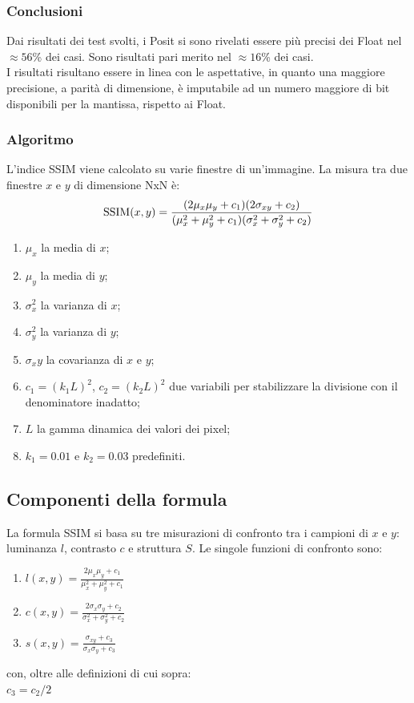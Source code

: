 \documentclass[a4paper,11pt]{article}
\begin{document}
    \subsubsection{Conclusioni}
    Dai risultati dei test svolti, i Posit si sono rivelati essere più precisi dei Float nel $\approx56$\% dei casi. Sono risultati pari merito nel $\approx16$\% dei casi.\\
    I risultati risultano essere in linea con le aspettative, in quanto una maggiore precisione, a parità di dimensione, è imputabile ad un numero maggiore di bit disponibili per la mantissa, rispetto ai Float. 
    
    \subsubsection{Algoritmo}
    L'indice SSIM viene calcolato su varie finestre di un'immagine. La misura tra due finestre $x$ e $y$ di dimensione NxN è: \\[0.2in]
        $$\hbox{SSIM}(x,y) = \frac{(2\mu_x\mu_y + c_1)(2\sigma_{xy} + c_2)}{(\mu_x^2 + \mu_y^2 + c_1)(\sigma_x^2 + \sigma_y^2 + c_2)}$$
    \begin{enumerate} 
        \item $\mu_x$ la media di $x$;
        \item $\mu_y$ la media di $y$;
        \item $\sigma_x^2$ la varianza di $x$;
        \item $\sigma_y^2$ la varianza di $y$;
        \item $\sigma_xy$ la covarianza di $x$ e $y$;
        \item $c_1=(k_1L)^2$, $c_2=(k_2L)^2$ due variabili per stabilizzare la divisione con il denominatore inadatto;
        \item $L$ la gamma dinamica dei valori dei pixel;
        \item $k_1=0.01$ e $k_2=0.03$ predefiniti.
   \end{enumerate}

    \subsection{Componenti della formula}
    La formula SSIM si basa su tre misurazioni di confronto tra i campioni di $x$ e $y$: luminanza $l$, contrasto $c$ e struttura $S$. Le singole funzioni di confronto sono:
    \begin{enumerate} 
        \item $l(x,y)=\frac{2\mu_x\mu_y + c_1}{\mu^2_x + \mu^2_y + c_1}$
        \item $c(x,y)=\frac{2\sigma_x\sigma_y + c_2}{\sigma^2_x + \sigma^2_y + c_2}$
        \item $s(x,y)=\frac{\sigma_{xy} + c_3}{\sigma_x \sigma_y + c_3}$
    \end{enumerate}
    con, oltre alle definizioni di cui sopra:\\
    $c_3 = c_2 / 2$ \\
\end{document}
